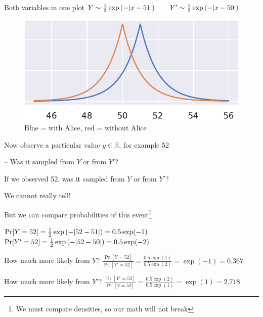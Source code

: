 \documentclass[12pt,aspectratio=169,handout]{beamer}
\begin{document}
\begin{frame}{Both variables in one plot}
$
Y \sim  \frac{1}{2} \exp \left( -\abs{x - 51} \right) \qquad
Y' \sim \frac{1}{2} \exp \left( -\abs{x - 50} \right) 
$

\begin{figure}
\centering
\includegraphics[width=0.6\linewidth]{img/laplace-02.pdf}
\caption{Blue = with Alice, red = without Alice}
\end{figure}

Now observe a particular value $y \in \mathbb{R}$, for example 52

-- Was it sampled from $Y$ or from $Y'$?

\end{frame}


\begin{frame}{If we observed 52, was it sampled from $Y$ or from $Y'$?}

We cannot really tell!

But we can compare probabilities of this event\footnote{We must compare densities, so our math will not break}

$
\Pr[Y = 52] = \frac{1}{2} \exp \left( -\abs{52 - 51} \right) = 0.5 \exp(-1)
$
$
\Pr[Y' = 52] = \frac{1}{2} \exp \left( -\abs{52 - 50} \right) = 0.5 \exp(-2)
$

How much more likely from $Y$?
$
\frac{\Pr[Y = 52]}{\Pr[Y' = 52]}
= \frac{0.5 \exp(1)}{0.5 \exp(2)} = \exp(-1) = 0.367
$

How much more likely from $Y'$?
$
\frac{\Pr[Y' = 52]}{\Pr[Y = 52]}
= \frac{0.5 \exp(2)}{0.5 \exp(1)} = \exp(1) = 2.718
$

\end{frame}
\end{document}
